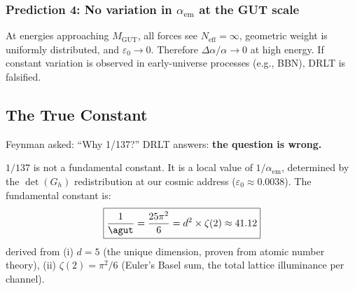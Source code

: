 \subsubsection{Prediction 4: No variation in $\alpha_\text{em}$ at the GUT scale}

At energies approaching $M_\text{GUT}$, all forces see $N_\text{eff} = \infty$, geometric weight is uniformly distributed, and $\varepsilon_0 \to 0$. Therefore $\Delta\alpha/\alpha \to 0$ at high energy. If constant variation is observed in early-universe processes (e.g., BBN), DRLT is falsified.

\subsection{The True Constant}

Feynman asked: ``Why 1/137?'' DRLT answers: \textbf{the question is wrong.}

$1/137$ is not a fundamental constant. It is a local value of $1/\alpha_\text{em}$, determined by the $\det(G_h)$ redistribution at our cosmic address ($\varepsilon_0 \approx 0.0038$). The fundamental constant is:
\begin{equation}
\boxed{\frac{1}{\agut} = \frac{25\pi^2}{6} = d^2 \times \zeta(2) \approx 41.12}
\end{equation}
derived from (i) $d = 5$ (the unique dimension, proven from atomic number theory), (ii) $\zeta(2) = \pi^2/6$ (Euler's Basel sum, the total lattice illuminance per channel).

